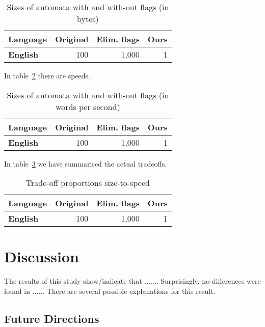 \documentclass[11pt]{article}
\begin{document}
\begin{table}
    \centering
    \begin{tabular}{|l|r|r|r|}
        \hline
        \bf Language & \bf Original & \bf Elim. flags & \bf Ours \\
        \hline
        \bf English & 100 & 1,000 & 1  \\
        \hline
    \end{tabular}
    \caption{Sizes of automata with and with-out flags (in bytes)
    \label{table:sizes}}
\end{table}

In table~\ref{table:speed} there are speeds.

\begin{table}
    \centering
    \begin{tabular}{|l|r|r|r|}
        \hline
        \bf Language & \bf Original & \bf Elim. flags & \bf Ours \\
        \hline
        \bf English & 100 & 1,000 & 1  \\
        \hline
    \end{tabular}
    \caption{Sizes of automata with and with-out flags (in words per second)
    \label{table:speed}}
\end{table}

In table~\ref{table:tradeoff} we have summarised the actual tradeoffs.

\begin{table}
    \centering
    \begin{tabular}{|l|r|r|r|}
        \hline
        \bf Language & \bf Original & \bf Elim. flags & \bf Ours \\
        \hline
        \bf English & 100 & 1,000 & 1  \\
        \hline
    \end{tabular}
    \caption{Trade-off proportions size-to-speed
    \label{table:tradeoff}}
\end{table}


\section{Discussion}
\label{sec:discussion}

The results of this study show/indicate that .......
Surprisingly, no differences were found in ......
There are several possible explanations for this result.

\subsection{Future Directions}
\label{subsec:future-directions}
\end{document}
